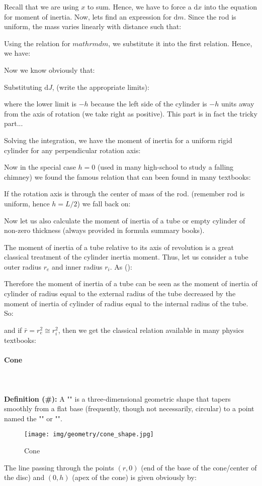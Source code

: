 {	Recall that we are using $x$ to sum. Hence, we have to force a $\mathrm{d}x$ into the equation for moment of inertia. Now, lets find an expression for $\mathrm{d}m$. Since the rod is uniform, the mass varies linearly with distance such that:
	
	Using the relation for $mathrm{d}m$, we substitute it into the first relation. Hence, we have:
	
	Now we know obviously that:
	
	Substituting $\mathrm{d}J$, (write the appropriate limits):
	
	where the lower limit is $-h$ because the left side of the cylinder is $-h$ units away from the axis of rotation (we take right as positive). This part is in fact the tricky part...

	Solving the integration, we have the moment of inertia for a uniform rigid cylinder for any perpendicular rotation axis:
	
	Now in the special case $h=0$ (used in many high-school to study a falling chimney) we found the famous relation that can been found in many textbooks:
	
	If the rotation axis is through the center of mass of the rod. (remember rod is uniform, hence $h=L/2$) we fall back on:
	
	
	Now let us also calculate the moment of inertia of a tube or empty cylinder of non-zero thickness (always provided in formula summary books). 
	
	The moment of inertia of a tube relative to its axis of revolution is a great classical treatment of the cylinder inertia moment. Thus, let us consider a tube outer radius $r_e$ and inner radius $r_i$. As ():
	
	Therefore the moment of inertia of a tube can be seen as the moment of inertia of cylinder of radius equal to the external radius of the tube decreased by the moment of inertia of cylinder of radius equal to the internal radius of the tube. So:
	
	and if $\bar{r}=r_e^2\cong r_i^2$, then we get the classical relation available in many physics textbooks:
	
	
	\pagebreak
	\paragraph{Cone}\mbox{}\\\\
	\textbf{Definition (\#\mydef):} A "" is a three-dimensional geometric shape that tapers smoothly from a flat base (frequently, though not necessarily, circular) to a point named the "" or "".
	\begin{figure}[H]
		\centering
		\texttt{[image: img/geometry/cone\_shape.jpg]}
		\caption{Cone}
	\end{figure}
	The line passing through the points $(r,0)$ (end of the base of the cone/center of the disc) and $(0,h)$ (apex of the cone) is given obviously by:
	
}
